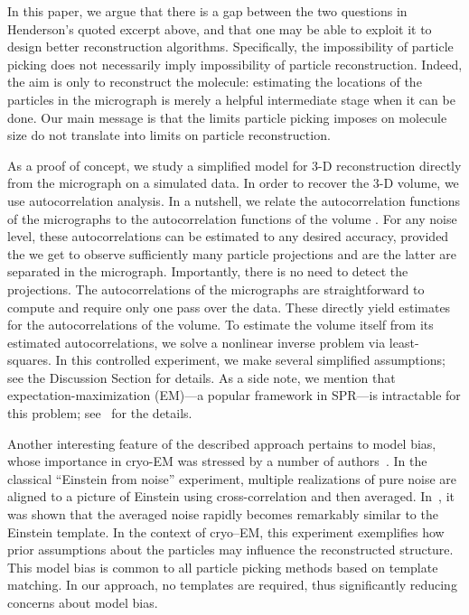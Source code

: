 \documentclass[english,11pt]{article}
\newcommand{\1}{\mathbf{1}}
\newcommand{\TODO}[1]{{\color{red}{[#1]}}}
\numberwithin{equation}{section}
\theoremstyle{plain}
\theoremstyle{definition}
\theoremstyle{remark}
\theoremstyle{plain}
\theoremstyle{remark}
\theoremstyle{plain}
\theoremstyle{plain}
\begin{document}
In this paper, we argue that there is a gap between the two questions in Henderson's quoted excerpt above, and that one may be able to exploit it to design better reconstruction algorithms.
Specifically, the impossibility of particle picking does not necessarily imply impossibility of particle reconstruction.
Indeed, the aim is only to reconstruct the molecule: estimating the locations of the particles in the micrograph is merely a helpful intermediate stage when it can be done. Our main message is that the limits particle picking imposes on molecule size do not translate into limits on particle reconstruction.

As a proof of concept, we study a simplified model for 3-D reconstruction directly from the micrograph on a simulated data. 
In order to recover the 3-D volume, we use autocorrelation analysis. In a nutshell, we relate the autocorrelation functions of the micrographs to the autocorrelation functions of the volume \TODO{To mention the expansions?}.
For any noise level, these autocorrelations can be estimated to any desired accuracy, provided the we get to observe sufficiently many particle projections and are the latter are separated in the micrograph. Importantly, there is no need to detect the projections. The autocorrelations of the micrographs are straightforward to compute and require only one pass over the data. These directly yield estimates for the autocorrelations of the volume. To estimate the volume itself from its estimated autocorrelations, we solve a nonlinear inverse problem via least-squares. In this controlled experiment, we make several simplified assumptions; see the Discussion Section for details. 
As a side note, we mention that expectation-maximization (EM)---a popular framework in SPR---is intractable for this problem; see~\cite{bendory2018estimation} for the details. \TODO{Do we want to stress that we get only low-resolution of the volume?}


Another interesting feature of the described approach pertains to model bias, whose importance in cryo-EM was stressed by a number of authors~\cite{shatsky2009method,vanheel1992correlation,henderson2013avoiding,vanheel2013finding}. In the classical ``Einstein from noise'' experiment, multiple realizations of pure noise are aligned to a picture of Einstein using cross-correlation and then averaged. In~\cite{shatsky2009method}, it was shown that the averaged noise rapidly becomes remarkably similar to the Einstein template. In the context of cryo--EM, this experiment exemplifies how prior assumptions about the particles may influence the reconstructed structure. This model bias is common to all particle picking methods based on template matching. In our approach, no templates are required, thus significantly reducing concerns about model bias. \TODO{To add reference to our example.}
\end{document}
